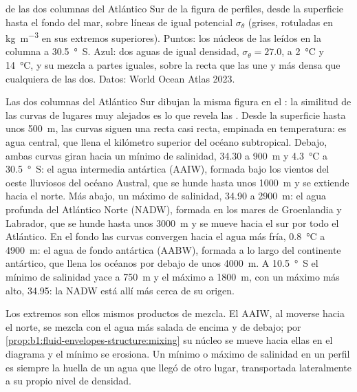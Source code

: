 \begin{omfigure}
{\small {} de las dos columnas del Atlántico Sur de la figura de perfiles, desde la superficie hasta el fondo del mar, sobre líneas de igual  potencial $\sigma_\theta$ (grises, rotuladas en \si{kg.m^{-3}} en sus extremos superiores). Puntos: los núcleos de las  leídos en la columna a \qty{30.5}{\degree S}. Azul: dos aguas de igual densidad, $\sigma_\theta = 27.0$, a \qty{2}{\celsius} y \qty{14}{\celsius}, y su mezcla a partes iguales, sobre la recta que las une y más densa que cualquiera de las dos. Datos: World Ocean Atlas 2023.}
\label{fig:b1:fluid-envelopes-structure:ts}
\end{omfigure}

Las dos columnas del Atlántico Sur dibujan la misma figura en el : la similitud de las curvas de lugares muy alejados es lo que revela las . Desde la superficie hasta unos \qty{500}{m}, las curvas siguen una recta casi recta, empinada en temperatura: es agua central, que llena el kilómetro superior del océano subtropical. Debajo, ambas curvas giran hacia un mínimo de salinidad, \num{34.30} a \qty{900}{m} y \qty{4.3}{\celsius} a \qty{30.5}{\degree S}: el agua intermedia antártica (AAIW), formada bajo los vientos del oeste lluviosos del océano Austral, que se hunde hasta unos \qty{1000}{m} y se extiende hacia el norte. Más abajo, un máximo de salinidad, \num{34.90} a \qty{2900}{m}: el agua profunda del Atlántico Norte (NADW), formada en los mares de Groenlandia y Labrador, que se hunde hasta unos \qty{3000}{m} y se mueve hacia el sur por todo el Atlántico. En el fondo las curvas convergen hacia el agua más fría, \qty{0.8}{\celsius} a \qty{4900}{m}: el agua de fondo antártica (AABW), formada a lo largo del continente antártico, que llena los océanos por debajo de unos \qty{4000}{m}. A \qty{10.5}{\degree S} el mínimo de salinidad yace a \qty{750}{m} y el máximo a \qty{1800}{m}, con un máximo más alto, \num{34.95}: la NADW está allí más cerca de su origen.

Los extremos son ellos mismos productos de mezcla. El AAIW, al moverse hacia el norte, se mezcla con el agua más salada de encima y de debajo; por \cref{prop:b1:fluid-envelopes-structure:mixing}
su núcleo se mueve hacia ellas en el diagrama y el mínimo se erosiona. Un mínimo o máximo de salinidad en un perfil es siempre la huella de un agua que llegó de otro lugar, transportada lateralmente a su propio nivel de densidad.

